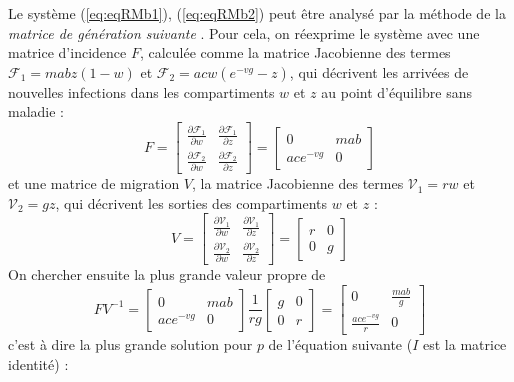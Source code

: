 Le système (\ref{eq:eqRMb1}), (\ref{eq:eqRMb2}) peut être analysé par la méthode de la\textit{ matrice de génération suivante} \cite{van2002reproduction}.
Pour cela, on réexprime le système avec une matrice d'incidence $F$, calculée comme la matrice Jacobienne des termes $\mathcal{F}_1=mabz(1-w)$ et $\mathcal{F}_2=acw(e^{-vg}-z)$, qui décrivent les arrivées de nouvelles infections dans les compartiments $w$ et $z$ au point d'équilibre sans maladie :
\begin{equation}
F= 
\begin{bmatrix} \frac{\partial \mathcal{F}_1 }{\partial w} & \frac{\partial \mathcal{F}_1 }{\partial z} \\ \frac{\partial \mathcal{F}_2 }{\partial w} & \frac{\partial \mathcal{F}_2 }{\partial z} \end{bmatrix} =
\begin{bmatrix} 0 & mab  \\ace^{-vg} & 0 \end{bmatrix}
\end{equation}
et une matrice de migration $V$, la matrice Jacobienne des termes $\mathcal{V}_1=rw$ et $\mathcal{V}_2=gz$, qui décrivent les sorties des compartiments $w$ et $z$ :
\begin{equation}
V=
\begin{bmatrix} \frac{\partial \mathcal{V}_1 }{\partial w} & \frac{\partial \mathcal{V}_1 }{\partial z} \\ \frac{\partial \mathcal{V}_2 }{\partial w} & \frac{\partial \mathcal{V}_2 }{\partial z} \end{bmatrix} =
\begin{bmatrix} r & 0 \\ 0 & g \end{bmatrix}
\end{equation}
On chercher ensuite la plus grande valeur propre de 
\begin{equation}
FV^{-1} = \begin{bmatrix} 0 & mab  \\ ace^{-vg} & 0 \end{bmatrix} \frac{1}{rg} \begin{bmatrix} g & 0 \\ 0 & r \end{bmatrix} = \begin{bmatrix} 0 & \frac{mab}{g}  \\ \frac{ace^{-vg}}{r} & 0 \end{bmatrix}
\end{equation}
c'est à dire la plus grande solution pour $p$ de l'équation suivante ($I$ est la matrice identité) :
